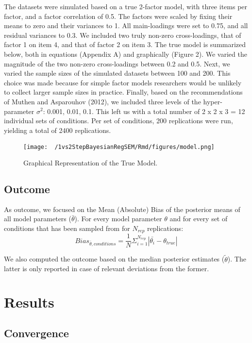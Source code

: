 \documentclass[
  man,floatsintext]{apa6}
\begin{document}
The datasets were simulated based on a true 2-factor model, with three items per factor, and a factor correlation of 0.5. The factors were scaled by fixing their means to zero and their variances to 1. All main-loadings were set to 0.75, and all residual variances to 0.3. We included two truly non-zero cross-loadings, that of factor 1 on item 4, and that of factor 2 on item 3. The true model is summarized below, both in equations (Appendix A) and graphically (Figure 2). We varied the magnitude of the two non-zero cross-loadings between 0.2 and 0.5. Next, we varied the sample sizes of the simulated datasets between 100 and 200. This choice was made because for simple factor models researchers would be unlikely to collect larger sample sizes in practice. Finally, based on the recommendations of Muthen and Asparouhov (2012), we included three levels of the hyper-parameter \(\sigma^2\): 0.001, 0.01, 0.1. This left us with a total number of 2 x 2 x 3 = 12 individual sets of conditions. Per set of conditions, 200 replications were run, yielding a total of 2400 replications.

\begin{figure}
\centering
\texttt{[image: ~/1vs2StepBayesianRegSEM/Rmd/figures/model.png]}
\caption{Graphical Representation of the True Model.}
\end{figure}

\hypertarget{outcome}{%
\subsection{Outcome}\label{outcome}}

As outcome, we focused on the Mean (Absolute) Bias of the posterior means of all model parameters (\(\bar{\theta}\)). For every model parameter \(\theta\) and for every set of conditions that has been sampled from for \(N_{rep}\) replications:
\[Bias_{\bar{\theta}, conditions} = \frac{1}{N} \Sigma_{i = 1}^{N_{rep}} |\bar{\theta_i} - \theta_{true}|\]

We also computed the outcome based on the median posterior estimates (\(\tilde{\theta}\)). The latter is only reported in case of relevant deviations from the former.

\hypertarget{results}{%
\section{Results}\label{results}}

\hypertarget{convergence}{%
\subsection{Convergence}\label{convergence}}
\end{document}
